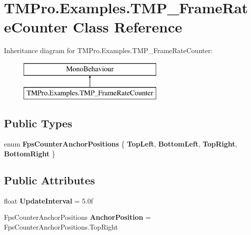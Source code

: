 \hypertarget{class_t_m_pro_1_1_examples_1_1_t_m_p___frame_rate_counter}{}\section{T\+M\+Pro.\+Examples.\+T\+M\+P\+\_\+\+Frame\+Rate\+Counter Class Reference}
\label{class_t_m_pro_1_1_examples_1_1_t_m_p___frame_rate_counter}
Inheritance diagram for T\+M\+Pro.\+Examples.\+T\+M\+P\+\_\+\+Frame\+Rate\+Counter\+:\begin{figure}[H]
\begin{center}
\leavevmode
\includegraphics[height=2.000000cm]{class_t_m_pro_1_1_examples_1_1_t_m_p___frame_rate_counter}
\end{center}
\end{figure}
\subsection*{Public Types}
\begin{DoxyCompactItemize}
\item 
\mbox{\label{class_t_m_pro_1_1_examples_1_1_t_m_p___frame_rate_counter_af5d815df33bfd48fcbca765dbdc1a6e5}} 
enum {\bfseries Fps\+Counter\+Anchor\+Positions} \{ {\bfseries Top\+Left}, 
{\bfseries Bottom\+Left}, 
{\bfseries Top\+Right}, 
{\bfseries Bottom\+Right}
 \}
\end{DoxyCompactItemize}
\subsection*{Public Attributes}
\begin{DoxyCompactItemize}
\item 
\mbox{\label{class_t_m_pro_1_1_examples_1_1_t_m_p___frame_rate_counter_ae8d84e2e21d6d819d48f594b09b0319b}} 
float {\bfseries Update\+Interval} = 5.\+0f
\item 
\mbox{\label{class_t_m_pro_1_1_examples_1_1_t_m_p___frame_rate_counter_a7c92928be05c154b10c2eb092425e865}} 
Fps\+Counter\+Anchor\+Positions {\bfseries Anchor\+Position} = Fps\+Counter\+Anchor\+Positions.\+Top\+Right
\end{DoxyCompactItemize}

